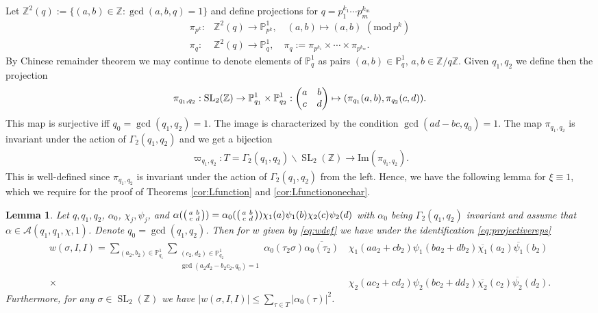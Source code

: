\documentclass[12pt]{amsart}
\newtheorem{lemma}[theorem]{Lemma}
\theoremstyle{definition}
\theoremstyle{remark}
\numberwithin{equation}{section}
\newcommand{\Z}{{\mathbb Z}}
\newcommand{\1}{{\mathbf 1}}
\newcommand{\SL}{\operatorname{SL}_2}
\renewcommand{\P}{\mathbb{P}}
\renewcommand{\pmod}[1]{\,\,(\mathrm{mod}\,{#1})}
\begin{document}
Let $\Z^2(q) := \{(a,b) \in \Z: \gcd (a,b,q)=1\}$ and  define projections
for $q= p_1^{k_1} \cdots p_m^{k_m}$
\begin{align*}
    \pi_{p^{k}}: &  \Z^2(q) \to  \mathbb{P}_{p^k}^{1}, \quad (a,b) \mapsto 
        (a,b) \pmod{p^k} \\
     \pi_{q}:&   \Z^2(q) \to \mathbb{P}_{q}^{1}, \quad \pi_q := \pi_{p^{k_1}} \times \cdots \times  \pi_{p^{k_m}}.
\end{align*}
By Chinese remainder theorem we may continue to denote elements of  $\mathbb{P}_{q}^{1}$ as pairs $(a,b) \in \mathbb{P}_{q}^{1}$, $a,b \in \Z/q \Z$.
Given $q_1,q_2$ we define then the projection 
\begin{align*}
    \pi_{q_1,q_2}: \SL(\Z) \to  \mathbb{P}_{q_1}^{1} \times  \mathbb{P}_{q_2}^{1}:  \mqty(a & b \\ c &d) \mapsto ( \pi_{q_1}(a,b) ,\pi_{q_2}(c,d)).
\end{align*}
This map is surjective iff $q_0=\gcd(q_1,q_2)=1$. The image is characterized by the condition $\gcd(ad-bc,q_0)=1$.  The map $   \pi_{q_1,q_2}$ is invariant under the action of $\Gamma_2(q_1,q_2)$ and we get a bijection 
\begin{align} \label{eq:projectivereps}
\varpi_{q_1,q_2}:  T=  \Gamma_2(q_1,q_2) \backslash \SL(\Z) \to    \mathrm{Im}(\pi_{q_1,q_2}).
\end{align}
This is well-defined since $\pi_{q_1,q_2}$ is invariant under the action of $\Gamma_2(q_1,q_2)$ from the left. Hence, we have the following lemma for $\xi \equiv 1$, which we require for the proof of Theorems \ref{cor:Lfunction} and \ref{cor:Lfunctiononechar}.
\begin{lemma} \label{lem:wsimplification}
     Let $q,q_1,q_2$, $\alpha_0$, $\chi_j,\psi_j$, and $\alpha(\smqty(a & b \\ c& d))= \alpha_0(\smqty(a & b \\ c& d)) \chi_1(a) \psi_1(b) \chi_2(c) \psi_2 (d)$ with $\alpha_0$ being $\Gamma_2(q_1,q_2)$ invariant and assume that $\alpha \in \mathcal{A}(q_1,q_1,\chi,1)$. Denote $q_0 = \gcd(q_1,q_2)$.
     Then for $w$ given by \eqref{eq:wdef} we have under the identification \eqref{eq:projectivereps} 
   \begin{align*}
          w(\sigma,I,I) = \sum_{(a_2,b_2) \in \P^{1}_{q_1} } \sum_{\substack{(c_2,d_2) \in \P^{1}_{q_2} \\ \gcd(a_2d_2-b_2c_2,q_0)=1}  } \alpha_0(\tau_2 \sigma ) \overline{\alpha_0(\tau_2 )}   
      & \, \chi_1  (a a_2 + c b_2) \psi_1(ba_2+db_2)\overline{\chi_1 } (a_2)  \overline{\psi_1 }(b_2)  \\
   \times& \,\chi_2 (a c_2+c d_2) \psi_2 (b c_2 + d d_2) \overline{ \chi_2} (c_2) \overline{  \psi_2} (d_2).
   \end{align*}
Furthermore, for any $\sigma \in \SL(\Z)$ we have $|w(\sigma,I,I)| \leq \sum_{\tau \in T} |\alpha_0(\tau)|^2$.
\end{lemma}
\end{document}
